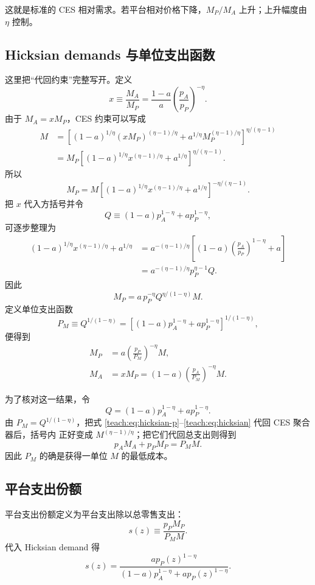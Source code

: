 \documentclass[UTF8,11pt,scheme=chinese,fontset=fandol]{ctexart}
\theoremstyle{definition}
\begin{document}
这就是标准的 CES 相对需求。若平台相对价格下降，\(M_P/M_A\) 上升；上升幅度由 \(\eta\)
控制。

\subsection{Hicksian demands 与单位支出函数}

这里把“代回约束”完整写开。定义
\[
x\equiv\frac{M_A}{M_P}
=\frac{1-a}{a}\left(\frac{p_A}{p_P}\right)^{-\eta}.
\]
由于 \(M_A=xM_P\)，CES 约束可以写成
\begin{align*}
M
&=\left[(1-a)^{1/\eta}(xM_P)^{(\eta-1)/\eta}
+a^{1/\eta}M_P^{(\eta-1)/\eta}\right]^{\eta/(\eta-1)}\\
&=M_P\left[(1-a)^{1/\eta}x^{(\eta-1)/\eta}
+a^{1/\eta}\right]^{\eta/(\eta-1)}.
\end{align*}
所以
\[
M_P
=M\left[(1-a)^{1/\eta}x^{(\eta-1)/\eta}
+a^{1/\eta}\right]^{-\eta/(\eta-1)}.
\]
把 \(x\) 代入方括号并令
\[
Q\equiv(1-a)p_A^{1-\eta}+ap_P^{1-\eta},
\]
可逐步整理为
\begin{align*}
(1-a)^{1/\eta}x^{(\eta-1)/\eta}+a^{1/\eta}
&=a^{-(\eta-1)/\eta}
\left[(1-a)\left(\frac{p_A}{p_P}\right)^{1-\eta}+a\right]\\
&=a^{-(\eta-1)/\eta}p_P^{\eta-1}Q.
\end{align*}
因此
\[
M_P
=a\,p_P^{-\eta}Q^{\eta/(1-\eta)}M.
\]
定义单位支出函数
\begin{equation}
P_M\equiv Q^{1/(1-\eta)}
=\left[(1-a)p_A^{1-\eta}+ap_P^{1-\eta}\right]^{1/(1-\eta)},
\label{teach:eq:price-index}
\end{equation}
便得到
\begin{align}
M_P&=a\left(\frac{p_P}{P_M}\right)^{-\eta}M,
\label{teach:eq:hicksian-p}\\
M_A&=xM_P
=(1-a)\left(\frac{p_A}{P_M}\right)^{-\eta}M.
\label{teach:eq:hicksian}
\end{align}

为了核对这一结果，令
\[
Q=(1-a)p_A^{1-\eta}+ap_P^{1-\eta}.
\]
由 \(P_M=Q^{1/(1-\eta)}\)，把式 \eqref{teach:eq:hicksian-p}--\eqref{teach:eq:hicksian}
代回 CES 聚合器后，括号内
正好变成 \(M^{(\eta-1)/\eta}\)；把它们代回总支出则得到
\[
p_AM_A+p_PM_P=P_MM.
\]
因此 \(P_M\) 的确是获得一单位 \(M\) 的最低成本。

\subsection{平台支出份额}

平台支出份额定义为平台支出除以总零售支出：
\[
s(z)\equiv\frac{p_PM_P}{P_MM}.
\]
代入 Hicksian demand 得
\begin{equation}
s(z)=
\frac{ap_P(z)^{1-\eta}}
{(1-a)p_A^{1-\eta}+ap_P(z)^{1-\eta}}.
\label{teach:eq:platform-share}
\end{equation}
\end{document}

